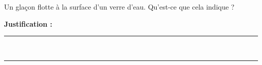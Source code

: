 Un glaçon flotte à la surface d'un verre d'eau. Qu'est-ce que cela indique ?

\choices

\noindent\textbf{Justification :} \hrulefill \\[2.5ex]
\rule{\linewidth}{0.4pt} \\[2.5ex]
\rule{\linewidth}{0.4pt}
\vfill
